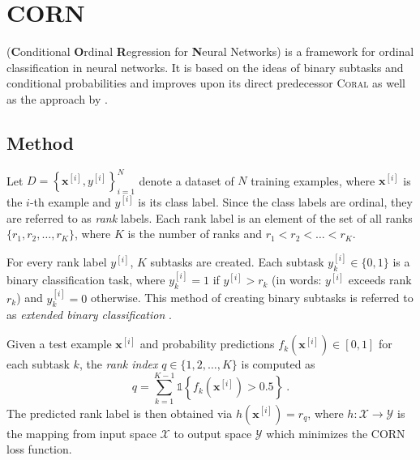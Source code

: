 \section{CORN} \label{sec:ordinal:corn}
\corn{} (\textbf{C}onditional \textbf{O}rdinal \textbf{R}egression for \textbf{N}eural Networks) \cite{corn}
is a framework for ordinal classification in neural networks.
It is based on the ideas of binary subtasks and conditional probabilities
and improves upon
  its direct predecessor \textsc{Coral} \cite{coral}
  as well as the approach by \citeauthor{extended_binary_nn} \cite{extended_binary_nn}.
%
%
%


\subsection{Method} \label{sec:corn:method}
%
Let $D = \left\{ \mathbf{x}^{[i]}, y^{[i]} \right\}_{i=1}^N$ denote a dataset of $N$ training examples,
where $\mathbf{x}^{[i]}$ is the $i$-th example and $y^{[i]}$ is its class label.
Since the class labels are ordinal, they are referred to as \emph{rank} labels.
Each rank label is an element of the set of all ranks $\{r_1, r_2, \ldots, r_K\}$,
  where
  $K$ is the number of ranks
  and $r_1 < r_2 < \ldots < r_K$.

For every rank label $y^{[i]}$,
$K$ subtasks are created. %
Each subtask $y^{[i]}_k \in \{0, 1\}$ is a binary classification task,
  where
    $y^{[i]}_k = 1$ if $y^{[i]} > r_k$ (in words: {$y^{[i]}$ exceeds rank $r_k$})
    and $y^{[i]}_k = 0$ otherwise.
This method of creating binary subtasks is referred to as \emph{extended binary classification} \cite{extended_binary}.

Given a test example $\mathbf{x}^{[i]}$
and probability predictions $f_k(\mathbf{x}^{[i]}) \in [0,1]$ for each subtask $k$,
the \emph{rank index} $q \in \{1, 2, \ldots, K\}$ is computed as
\begin{equation}
  q = \sum_{k=1}^{K-1} \mathbb{1}\left\{f_k(\mathbf{x}^{[i]}) > 0.5\right\} \ .
\end{equation}
The predicted rank label is then obtained via
$h(\mathbf{x}^{[i]}) = r_q$,
where $h: \mathcal{X} \to \mathcal{Y}$ is the mapping from input space $\mathcal{X}$ to output space $\mathcal{Y}$ %
which minimizes the CORN loss function.


